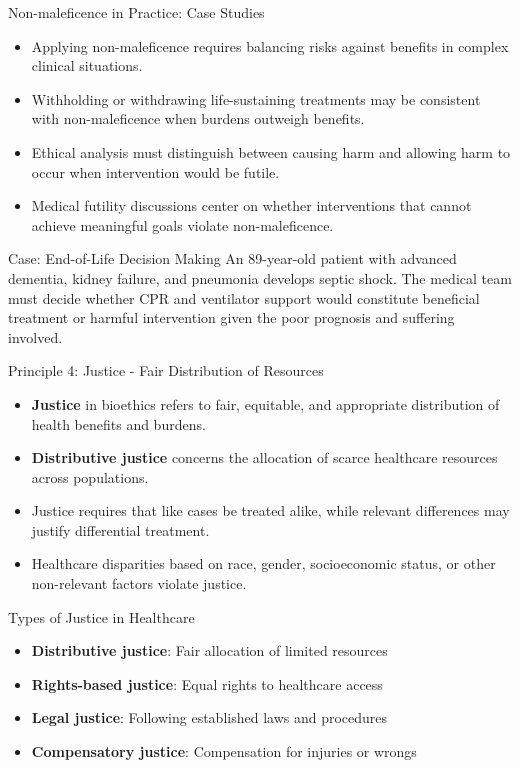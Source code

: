 \documentclass{beamer}
\begin{document}
	\begin{frame}{Non-maleficence in Practice: Case Studies}
		\begin{itemize}
			\item Applying non-maleficence requires balancing risks against benefits in complex clinical situations.
			\item Withholding or withdrawing life-sustaining treatments may be consistent with non-maleficence when burdens outweigh benefits.
			\item Ethical analysis must distinguish between causing harm and allowing harm to occur when intervention would be futile.
			\item Medical futility discussions center on whether interventions that cannot achieve meaningful goals violate non-maleficence.
		\end{itemize}
		
		\begin{exampleblock}{Case: End-of-Life Decision Making}
			An 89-year-old patient with advanced dementia, kidney failure, and pneumonia develops septic shock. The medical team must decide whether CPR and ventilator support would constitute beneficial treatment or harmful intervention given the poor prognosis and suffering involved.
		\end{exampleblock}
	\end{frame}
	
	\begin{frame}{Principle 4: Justice - Fair Distribution of Resources}
		\begin{itemize}
			\item \textbf{Justice} in bioethics refers to fair, equitable, and appropriate distribution of health benefits and burdens.
			\item \textbf{Distributive justice} concerns the allocation of scarce healthcare resources across populations.
			\item Justice requires that like cases be treated alike, while relevant differences may justify differential treatment.
			\item Healthcare disparities based on race, gender, socioeconomic status, or other non-relevant factors violate justice.
		\end{itemize}
		
		\begin{block}{Types of Justice in Healthcare}
			\begin{itemize}
				\item \textbf{Distributive justice}: Fair allocation of limited resources
				\item \textbf{Rights-based justice}: Equal rights to healthcare access
				\item \textbf{Legal justice}: Following established laws and procedures
				\item \textbf{Compensatory justice}: Compensation for injuries or wrongs
			\end{itemize}
		\end{block}
	\end{frame}
	
\end{document}
